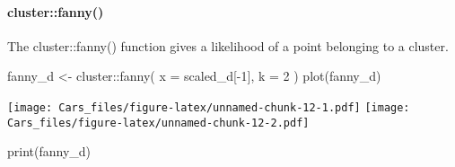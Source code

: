 \documentclass[
]{article}
\newenvironment{Shaded}{\begin{snugshade}}{\end{snugshade}}
\newcommand{\AttributeTok}[1]{\textcolor[rgb]{0.77,0.63,0.00}{#1}}
\newcommand{\DecValTok}[1]{\textcolor[rgb]{0.00,0.00,0.81}{#1}}
\newcommand{\FunctionTok}[1]{\textcolor[rgb]{0.00,0.00,0.00}{#1}}
\newcommand{\NormalTok}[1]{#1}
\newcommand{\OtherTok}[1]{\textcolor[rgb]{0.56,0.35,0.01}{#1}}
\newcommand{\SpecialCharTok}[1]{\textcolor[rgb]{0.00,0.00,0.00}{#1}}
\begin{document}
\hypertarget{clusterfanny}{%
\paragraph{cluster::fanny()}\label{clusterfanny}}

The cluster::fanny() function gives a likelihood of a point belonging to
a cluster.

\begin{Shaded}
\begin{Highlighting}[]
\NormalTok{fanny\_d }\OtherTok{\textless{}{-}}\NormalTok{ cluster}\SpecialCharTok{::}\FunctionTok{fanny}\NormalTok{(}
  \AttributeTok{x =}\NormalTok{ scaled\_d[}\SpecialCharTok{{-}}\DecValTok{1}\NormalTok{],}
  \AttributeTok{k =} \DecValTok{2}
\NormalTok{)}
\FunctionTok{plot}\NormalTok{(fanny\_d)}
\end{Highlighting}
\end{Shaded}

\texttt{[image: Cars\_files/figure-latex/unnamed-chunk-12-1.pdf]}
\texttt{[image: Cars\_files/figure-latex/unnamed-chunk-12-2.pdf]}

\begin{Shaded}
\begin{Highlighting}[]
\FunctionTok{print}\NormalTok{(fanny\_d)}
\end{Highlighting}
\end{Shaded}
\end{document}
